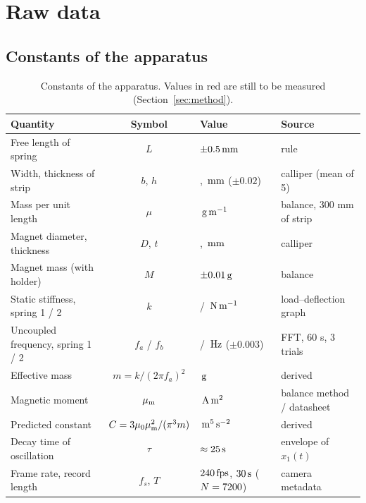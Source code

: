 \section{Raw data}\label{sec:rawdata}

\subsection{Constants of the apparatus}

\begin{table}[htbp]
\centering\footnotesize
\caption{Constants of the apparatus. Values in red are still to be measured (Section~\ref{sec:method}).}
\label{tab:constants}
\setlength{\tabcolsep}{4pt}
\begin{tabular}{@{}p{4.3cm}cp{4.6cm}p{3.6cm}@{}}
\toprule
Quantity & Symbol & Value & Source \\
\midrule
Free length of spring & $L$ & \TBM{\ldots}$\pm0.5\,\mathrm{mm}$ & rule \\
Width, thickness of strip & $b$, $h$ & \TBM{\ldots}, \TBM{\ldots}$\,\mathrm{mm}$ ($\pm0.02$) & calliper (mean of 5) \\
Mass per unit length & $\mu$ & \TBM{\ldots}$\,\mathrm{g\,m^{-1}}$ & balance, 300 mm of strip \\
Magnet diameter, thickness & $D$, $t$ & \TBM{\ldots}, \TBM{\ldots}$\,\mathrm{mm}$ & calliper \\
Magnet mass (with holder) & $M$ & \TBM{\ldots}$\pm0.01\,\mathrm{g}$ & balance \\
Static stiffness, spring 1 / 2 & $k$ & \TBM{\ldots} / \TBM{\ldots}$\,\mathrm{N\,m^{-1}}$ & load--deflection graph \\
Uncoupled frequency, spring 1 / 2 & $f_a$ / $f_b$ & \TBM{\ldots} / \TBM{\ldots}$\,\mathrm{Hz}$ ($\pm0.003$) & FFT, 60 s, 3 trials \\
Effective mass & $m=k/(2\pi f_a)^2$ & \TBM{\ldots}$\,\mathrm{g}$ & derived \\
Magnetic moment & $\mu_{\mathrm m}$ & \TBM{\ldots}$\,\mathrm{A\,m^2}$ & balance method / datasheet \\
Predicted constant & $C=3\mu_0\mu_{\mathrm m}^2/(\pi^3m)$ & \TBM{\ldots}$\,\mathrm{m^5\,s^{-2}}$ & derived \\
Decay time of oscillation & $\tau$ & $\approx25\,\mathrm{s}$ & envelope of $x_1(t)$ \\
Frame rate, record length & $f_s$, $T$ & $240\,\mathrm{fps}$, $30\,\mathrm{s}$ ($N=7200$) & camera metadata \\
\bottomrule
\end{tabular}
\end{table}

